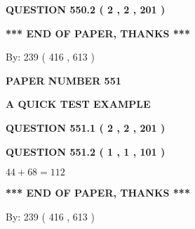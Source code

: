 \documentclass[12pt]{article}
\begin{document}
 
  
\vspace{0.2in}
  
{\textbf{\Large{QUESTION
550.2 
 ( 2 , 2 , 201 )
}}}
  
  
   
   
 \vspace{0.2in}
 
   
   
   
   
\vspace{1.0in} 
{\textbf{\large{ *** END OF PAPER, THANKS *** }}} 
   
   
\hspace{1.0in} By: 
 239 ( 416 ,  613 )
   
   
   
   
\newpage 
\setcounter{page}{ 
   551001 } 
   
   
   
   
 {\textbf{ \Large{ PAPER NUMBER  551  }}}
   
   
\vspace{0.2in}
   
   
   
   
   
   
 \vspace{0.2in}
{\LARGE {\textbf{ A QUICK TEST EXAMPLE}}}
   
   
  
\vspace{0.2in}
  
{\textbf{\Large{QUESTION
551.1 
 ( 2 , 2 , 201 )
}}}
  
  
  
\vspace{0.2in}
  
{\textbf{\Large{QUESTION
551.2 
 ( 1 , 1 , 101 )
}}}
  
  
 
 

$ %
44 +  %
68=   %
112$
 
 
   
   
 \vspace{0.2in}
 
   
   
   
   
\vspace{1.0in} 
{\textbf{\large{ *** END OF PAPER, THANKS *** }}} 
   
   
\hspace{1.0in} By: 
 239 ( 416 ,  613 )
   
\end{document}
